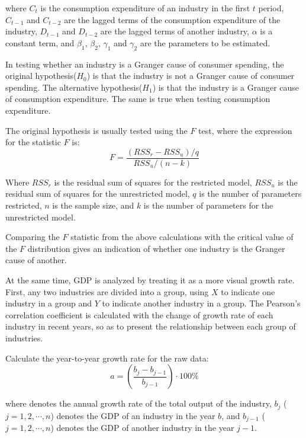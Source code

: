 \documentclass[12pt]{article}  %
\begin{document}
	where $C_t$ is the consumption expenditure of an industry in the first $t$ period, $C_{t-1}$ and $C_{t-2}$ are the lagged terms of the consumption expenditure of the industry, $D_{t-1}$ and $D_{t-2}$ are the lagged terms of another industry, $\alpha$ is a constant term, and $\beta_1$, $\beta_2$, ${\gamma_1}$ and ${\gamma_2}$ are the parameters to be estimated.
	
	In testing whether an industry is a Granger cause of consumer spending, the original hypothesis($H_0$) is that the industry is not a Granger cause of consumer spending. The alternative hypothesis($H_1$) is that the industry is a Granger cause of consumption expenditure. The same is true when testing consumption expenditure.
	
	The original hypothesis is usually tested using the $F$ test, where the expression for the statistic $F$ is:
	\begin{equation}
	F = \frac{{(RS{S_r} - RS{S_u})/q}}{{RS{S_u}/(n - k)}}
	\end{equation}

	Where $RS{S_r}$ is the residual sum of squares for the restricted model, $RSS_u$ is the residual sum of squares for the unrestricted model, $q$ is the number of parameters restricted, $n$ is the sample size, and $k$ is the number of parameters for the unrestricted model.
	
	Comparing the $F$ statistic from the above calculations with the critical value of the $F$ distribution gives an indication of whether one industry is the Granger cause of another.
	
	At the same time, GDP is analyzed by treating it as a more visual growth rate. First, any two industries are divided into a group, using $X$ to indicate one industry in a group and $Y$ to indicate another industry in a group. The Pearson's correlation coefficient is calculated with the change of growth rate of each industry in recent years, so as to present the relationship between each group of industries.
	
	Calculate the year-to-year growth rate for the raw data:
	\begin{equation}
		a = (\frac{{{b_j} - {b_{j - 1}}}}{{{b_{j - 1}}}}) \cdot 100\%
	\end{equation}

	where denotes the annual growth rate of the total output of the industry, ${b_j}$ ($j = 1, 2, \cdots, n $) denotes the GDP of an industry in the year $b$, and $b_{j-1}$ ($j = 1, 2, \cdots, n $) denotes the GDP of another industry in the year $j-1$.
	
\end{document}
